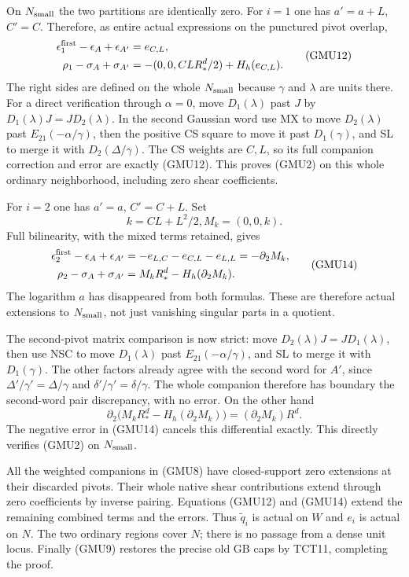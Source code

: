 On $N_{\rm small}$ the two partitions are identically zero.
For $i=1$ one has $a'=a+L$, $C'=C$.  Therefore, as entire
actual expressions on the punctured pivot overlap,
\[
 \begin{split}
 \epsilon_1^{\rm first}-\epsilon_A+\epsilon_{A'}&=e_{C,L},\\
 \rho_1-\sigma_A+\sigma_{A'}
               &=-(0,0,CL R_*^d/2)+H_h(e_{C,L}).
 \end{split}
 \tag{GMU12}
\]
The right sides are defined on the whole $N_{\rm small}$ because
$\gamma$ and $\lambda$ are units there.  For a direct verification
through $\alpha=0$, move $D_1(\lambda)$ past $J$ by
$D_1(\lambda)J=JD_2(\lambda)$.  In the second Gaussian word use
MX to move $D_2(\lambda)$ past $E_{21}(-\alpha/\gamma)$,
then the positive CS square to move it past $D_1(\gamma)$,
and SL to merge it with $D_2(\Delta/\gamma)$.
The CS weights are $C,L$, so its full companion correction and
error are exactly (GMU12).  This proves (GMU2) on this whole
ordinary neighborhood, including zero shear coefficients.

For $i=2$ one has $a'=a$, $C'=C+L$.  Set
\[
                        k=CL+L^2/2,
                         M_k=(0,0,k).
 \tag{GMU13}
\]
Full bilinearity, with the mixed terms retained, gives
\[
 \begin{split}
 \epsilon_2^{\rm first}-\epsilon_A+\epsilon_{A'}
       &=-e_{L,C}-e_{C,L}-e_{L,L}=-\partial_2M_k,\\
 \rho_2-\sigma_A+\sigma_{A'}
       &=M_kR_*^d-H_h(\partial_2M_k).
 \end{split}
 \tag{GMU14}
\]
The logarithm $a$ has disappeared from both formulas.  These
are therefore actual extensions to $N_{\rm small}$, not just
vanishing singular parts in a quotient.

The second-pivot matrix comparison is now strict: move
$D_2(\lambda)J=JD_1(\lambda)$, then use NSC to move
$D_1(\lambda)$ past $E_{21}(-\alpha/\gamma)$, and SL to
merge it with $D_1(\gamma)$.  The other factors already agree
with the second word for $A'$, since
$\Delta'/\gamma'=\Delta/\gamma$ and
$\delta'/\gamma'=\delta/\gamma$.
The whole companion therefore has boundary the second-word pair
discrepancy, with no error.  On the other hand
\[
 \partial_2\bigl(M_kR_*^d-H_h(\partial_2M_k)\bigr)
                    =(\partial_2M_k)R^d.
 \tag{GMU15}
\]
The negative error in (GMU14) cancels this differential exactly.
This directly verifies (GMU2) on $N_{\rm small}$.

All the weighted companions in (GMU8) have closed-support zero
extensions at their discarded pivots.  Their whole native shear
contributions extend through zero coefficients by inverse pairing.
Equations (GMU12) and (GMU14) extend the remaining combined
terms and the errors.  Thus $\widetilde q_i$ is actual on $W$
and $e_i$ is actual on $N$.  The two ordinary regions cover $N$;
there is no passage from a dense unit locus.  Finally (GMU9)
restores the precise old GB caps by TCT11, completing the proof.

